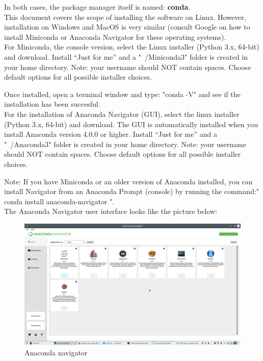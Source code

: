 \documentclass[a4paper,10pt]{article}
\begin{document}
In both cases, the package manager itself is named: \textbf{conda}.\\
This document covers the scope of installing the software on Linux. However, installation on Windows and MacOS is very similar (consult Google on how to install Miniconda or Anaconda Navigator for these operating systems).\\

For Miniconda, the console version, select the Linux installer (Python 3.x, 64-bit) and download. Install “Just for me” and a "~/Miniconda3" folder is created in your home directory.
Note: your username should NOT contain spaces.
Choose default options for all possible installer choices.

Once installed, open a terminal window and type: "conda -V" and see if the installation has been succesful.\\

For the installation of Anaconda Navigator (GUI), select the linux installer (Python 3.x, 64-bit) and download. The GUI is automatically installed when you install Anaconda version 4.0.0 or higher. Install “Just for me” and a  "~/Anaconda3" folder is created in your home directory.
Note: your username should NOT contain spaces.
Choose default options for all possible installer choices.

Note: If you have Miniconda or an older version of Anaconda installed, you can install Navigator from an Anaconda Prompt (console) by running the command:" conda install anaconda-navigator ".\\

The Anaconda Navigator user interface looks like the picture below:

\vspace{5mm}

\begin{figure}[H]
\centering
\includegraphics[width=1\columnwidth]{Pictures/Anaconda_navigator.png}
\caption[Short title]{Anaconda navigator}
\label{fig:ff1}\end{figure}
\end{document}
